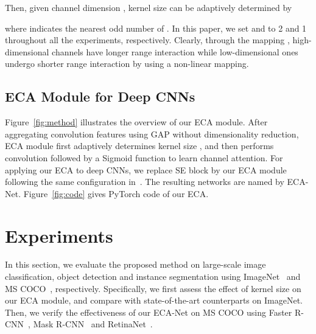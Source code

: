 \documentclass[10pt,twocolumn,letterpaper]{article}
\begin{document}
Then, given channel dimension , kernel size  can be adaptively determined by
	
where  indicates the nearest odd number of . In this paper, we set  and  to 2 and 1 throughout all the experiments, respectively. Clearly, through the mapping , high-dimensional channels have longer range interaction while low-dimensional ones undergo shorter range interaction by using a non-linear mapping.

\subsection{ECA Module for Deep CNNs}
Figure~\ref{fig:method} illustrates the overview of our ECA module. After aggregating convolution features using GAP without dimensionality reduction,  ECA module first adaptively determines kernel size , and then performs  convolution followed by a Sigmoid function to learn channel attention. For applying our ECA to deep CNNs, we replace SE block by our ECA module following the same configuration in~\cite{SENet18}. The resulting networks are named by ECA-Net. Figure~\ref{fig:code} gives PyTorch code of our ECA.

\section{Experiments}
In this section, we evaluate the proposed method on large-scale image classification, object detection and instance segmentation using ImageNet~\cite{imagenet_cvpr09} and MS COCO~\cite{lin2014microsoft}, respectively. Specifically, we first assess the effect of kernel size on our ECA module, and compare with state-of-the-art counterparts on ImageNet. Then, we verify the effectiveness of our ECA-Net on MS COCO using Faster R-CNN~\cite{DBLP:journals/pami/RenHG017}, Mask R-CNN~\cite{DBLP:conf/iccv/HeGDG17} and RetinaNet~\cite{DBLP:conf/iccv/LinGGHD17}. 
\end{document}

